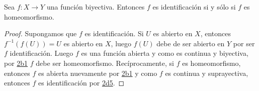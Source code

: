 

\begin{proposition}
Sea $f : X \longrightarrow Y$ una función biyectiva. Entonces $f$ es identificación si y sólo si $f$ es homeomorfismo.
\end{proposition}

\begin{proof}
Supongamos que $f$ es identificación. Si $U$ es abierto en $X$, entonces $f^{-1}(f(U)) = U$ es abierto en $X$, luego $f(U)$ debe de ser abierto en $Y$ por ser $f$ identificación. Luego $f$ es una función abierta y como es continua y biyectiva, por \hyperref[card:2b1]{\textsf{2b1}} $f$ debe ser homeomorfismo. Recíprocamente, si $f$ es homeomorfismo, entonces $f$ es abierta nuevamente por \hyperref[card:2b1]{\textsf{2b1}} y como $f$ es continua y suprayectiva, entonces $f$ es identificación por \hyperref[card:2d5]{\textsf{2d5}}.
\end{proof}

